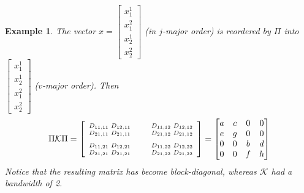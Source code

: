 \documentclass{article}
\newcommand{\K}{\mathcal{K}}
\newtheorem{example}{Example}
\begin{document}
\begin{example}
  The vector $x = \begin{bmatrix} x_1^1 \\ x_1^2 \\ x_2^1 \\ x_2^2
    \end{bmatrix}$ (in $j$-major order) is reordered by $\Pi$ into
  $\begin{bmatrix} x_1^1 \\ x_2^1 \\ x_1^2 \\ x_2^2 \end{bmatrix}$ ($v$-major order).
  Then
  \[\Pi \K \Pi =
    \begin{bmatrix}
      \hspace{0.3em}
      \begin{smallmatrix}
        \rule{0pt}{2.2ex}
        D_{11, 11} & D_{12, 11} \\
        D_{21, 11} & D_{21, 11}
        \rule[-1.2ex]{0pt}{0pt}
      \end{smallmatrix}
      \hspace{0.8em} &
      \hspace{0.3em}
      \begin{smallmatrix}
        \rule{0pt}{2.2ex}
        D_{11, 12} & D_{12, 12} \\
        D_{21, 12} & D_{21, 12}
        \rule[-1.2ex]{0pt}{0pt}
      \end{smallmatrix}
      \hspace{0.3em}   \\
      \hspace{0.3em}
      \begin{smallmatrix}
        \rule{0pt}{2.2ex}
        D_{11, 21} & D_{12, 21} \\
        D_{21, 21} & D_{21, 21}
        \rule[-1.2ex]{0pt}{0pt}
      \end{smallmatrix}
      \hspace{0.8em} &
      \hspace{0.3em}
      \begin{smallmatrix}
        \rule{0pt}{2.2ex}
        D_{11, 22} & D_{12, 22} \\
        D_{21, 22} & D_{21, 22}
        \rule[-1.2ex]{0pt}{0pt}
      \end{smallmatrix}
      \hspace{0.3em}
    \end{bmatrix}
    =
    \begin{bmatrix}
      a & c & 0 & 0 \\
      e & g & 0 & 0 \\
      0 & 0 & b & d \\
      0 & 0 & f & h
    \end{bmatrix}
  \]
  Notice that the resulting matrix has become block-diagonal, whereas $\K$ had a bandwidth of 2.
\end{example}
\end{document}

